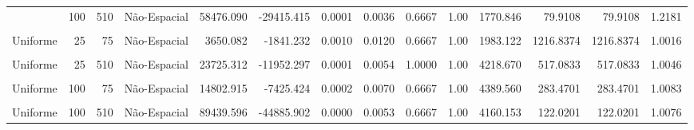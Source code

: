 \documentclass[
]{article}
\begin{document}
\begin{longtable}[t]{lrrlrrrrrrrrrr}
\cmidrule{1-14}\pagebreak[0]
0.7 & 100 & 510 & Não-Espacial & 58476.090 & -29415.415 & 0.0001 & 0.0036 & 0.6667 & 1.00 & 1770.846 & 79.9108 & 79.9108 & 1.2181\\
\cmidrule{1-14}\pagebreak[0]
\cellcolor{gray!10}{Uniforme} & \cellcolor{gray!10}{25} & \cellcolor{gray!10}{75} & \cellcolor{gray!10}{Espacial} & \cellcolor{gray!10}{3648.656} & \cellcolor{gray!10}{-1839.520} & \cellcolor{gray!10}{0.0011} & \cellcolor{gray!10}{0.0201} & \cellcolor{gray!10}{0.6667} & \cellcolor{gray!10}{1.00} & \cellcolor{gray!10}{1992.141} & \cellcolor{gray!10}{657.5760} & \cellcolor{gray!10}{109.3491} & \cellcolor{gray!10}{1.2194}\\
\cmidrule{1-14}\pagebreak[0]
Uniforme & 25 & 75 & Não-Espacial & 3650.082 & -1841.232 & 0.0010 & 0.0120 & 0.6667 & 1.00 & 1983.122 & 1216.8374 & 1216.8374 & 1.0016\\
\cmidrule{1-14}\pagebreak[0]
\cellcolor{gray!10}{Uniforme} & \cellcolor{gray!10}{25} & \cellcolor{gray!10}{510} & \cellcolor{gray!10}{Espacial} & \cellcolor{gray!10}{23718.382} & \cellcolor{gray!10}{-11947.255} & \cellcolor{gray!10}{0.0001} & \cellcolor{gray!10}{0.0073} & \cellcolor{gray!10}{1.0000} & \cellcolor{gray!10}{1.00} & \cellcolor{gray!10}{4317.944} & \cellcolor{gray!10}{429.5795} & \cellcolor{gray!10}{70.1019} & \cellcolor{gray!10}{1.1340}\\
\cmidrule{1-14}\pagebreak[0]
Uniforme & 25 & 510 & Não-Espacial & 23725.312 & -11952.297 & 0.0001 & 0.0054 & 1.0000 & 1.00 & 4218.670 & 517.0833 & 517.0833 & 1.0046\\
\cmidrule{1-14}\pagebreak[0]
\cellcolor{gray!10}{Uniforme} & \cellcolor{gray!10}{100} & \cellcolor{gray!10}{75} & \cellcolor{gray!10}{Espacial} & \cellcolor{gray!10}{14803.565} & \cellcolor{gray!10}{-7429.669} & \cellcolor{gray!10}{0.0002} & \cellcolor{gray!10}{0.0074} & \cellcolor{gray!10}{0.6667} & \cellcolor{gray!10}{1.00} & \cellcolor{gray!10}{4492.180} & \cellcolor{gray!10}{332.5966} & \cellcolor{gray!10}{58.3081} & \cellcolor{gray!10}{1.3110}\\
\cmidrule{1-14}\pagebreak[0]
Uniforme & 100 & 75 & Não-Espacial & 14802.915 & -7425.424 & 0.0002 & 0.0070 & 0.6667 & 1.00 & 4389.560 & 283.4701 & 283.4701 & 1.0083\\
\cmidrule{1-14}\pagebreak[0]
\cellcolor{gray!10}{Uniforme} & \cellcolor{gray!10}{100} & \cellcolor{gray!10}{510} & \cellcolor{gray!10}{Espacial} & \cellcolor{gray!10}{89441.473} & \cellcolor{gray!10}{-44900.852} & \cellcolor{gray!10}{0.0000} & \cellcolor{gray!10}{0.0064} & \cellcolor{gray!10}{0.6667} & \cellcolor{gray!10}{1.00} & \cellcolor{gray!10}{4671.257} & \cellcolor{gray!10}{127.6622} & \cellcolor{gray!10}{15.2024} & \cellcolor{gray!10}{1.2969}\\
\cmidrule{1-14}\pagebreak[0]
Uniforme & 100 & 510 & Não-Espacial & 89439.596 & -44885.902 & 0.0000 & 0.0053 & 0.6667 & 1.00 & 4160.153 & 122.0201 & 122.0201 & 1.0076\\
\bottomrule
\end{longtable}
\endgroup{}
\end{document}
